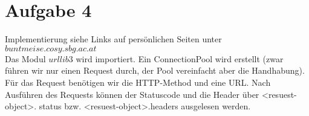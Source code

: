\documentclass[12pt, a4paper]{report}
\begin{document}
\section*{Aufgabe 4}
Implementierung siehe Links auf persönlichen Seiten unter $buntmeise.cosy.sbg.ac.at$\\
Das Modul $urllib3$ wird importiert. Ein ConnectionPool wird erstellt (zwar führen wir nur einen Request durch, der Pool vereinfacht aber die Handhabung). Für das Request benötigen wir die HTTP-Method und eine URL. Nach Ausführen des Requests können der Statuscode und die Header über <resuest-object>. status bzw. <resuest-object>.headers ausgelesen werden.
\end{document}
